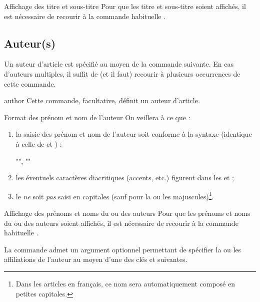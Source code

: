 \documentclass[french,nolocaltoc]{nwejmart}
\newtheorem[title=Fait,style=definition]{fact}
\begin{document}
\begin{dbremark}{Affichage des titre et sous-titre}{}
  Pour que les titre et sous-titre soient affichés, il est nécessaire de
  recourir à la commande habituelle .
\end{dbremark}

\subsection{Auteur(s)}
\label{sec-auteurs}

Un auteur d'article est spécifié au moyen de la commande 
suivante. En cas d'auteurs multiples, il suffit de (et il faut) recourir
à plusieurs occurrences de cette commande.

\begin{docCommand}{author}{}
  Cette commande, facultative, définit un auteur d'article.
\end{docCommand}
%
\begin{dbwarning}{Format des prénom et nom de l'auteur}{}
  On veillera à ce que :
  \begin{enumerate}
  \item la saisie des prénom et nom de l'auteur soit conforme à la syntaxe
    (identique à celle de  et ) :
\begin{bodycode}[listing options={showspaces}]
"", ""
\end{bodycode}
  \item les éventuels caractères diacritiques (accents, etc.) figurent dans les
     et  ;
  \item le  \emph{ne} soit \emph{pas} saisi en capitales (sauf pour la
    ou les majuscules)\footnote{Dans les articles en français, ce nom sera
      automatiquement composé en petites capitales.}.
  \end{enumerate}
\end{dbwarning}

\begin{dbremark}{Affichage des prénoms et noms du ou des auteurs}{}
  Pour que les prénoms et noms du ou des auteurs soient affichés, il est
  nécessaire de recourir à la commande habituelle .
\end{dbremark}

La commande  admet un argument optionnel permettant de spécifier
la ou les affiliations de l'auteur au moyen d'une des clés 
et  suivantes.
\end{document}
